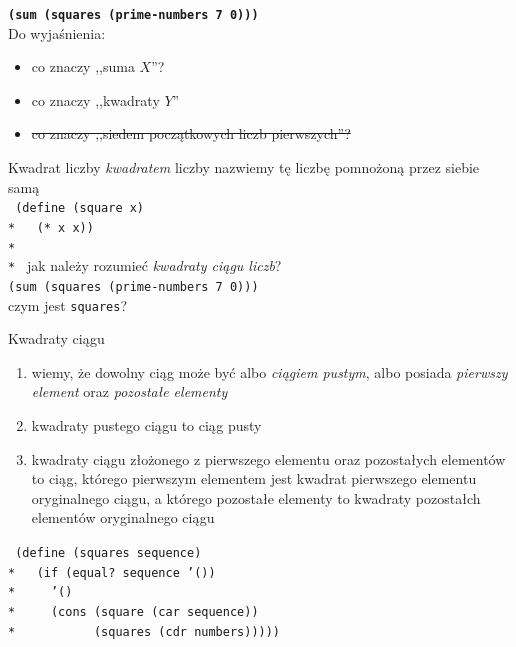 \documentclass{beamer}
\begin{document}


\begin{frame}
  \textbf{\texttt{(sum (squares (prime-numbers 7 0)))}}\\

  Do wyjaśnienia:
  \begin{itemize}
  \item co znaczy ,,suma $X$''?
  \item co znaczy ,,kwadraty $Y$''
  \item \sout{co znaczy ,,siedem początkowych liczb pierwszych''?}
  \end{itemize}
\end{frame}

\begin{frame}{Kwadrat liczby}
  \textit{kwadratem} liczby nazwiemy tę liczbę pomnożoną przez siebie samą\pause\\
  \texttt{
(define (square x)\\*
\ \ (* x x))\\*
\ \\*    
  }
  \pause
  jak należy rozumieć \textit{kwadraty ciągu liczb}?\\ \pause
  \texttt{(sum (squares (prime-numbers 7 0)))} \\ \pause
  {\tiny czym jest \texttt{squares}?}
\end{frame}

\begin{frame}{Kwadraty ciągu}
  \begin{enumerate}
  \item wiemy, że dowolny ciąg może być albo \textit{ciągiem pustym},
    albo posiada \textit{pierwszy element} oraz
    \textit{pozostałe elementy} \pause
    
  \item kwadraty pustego ciągu to ciąg pusty \pause
    
  \item kwadraty ciągu złożonego z pierwszego elementu oraz pozostałych
    elementów to ciąg, którego pierwszym elementem jest kwadrat pierwszego
    elementu oryginalnego ciągu, a którego pozostałe elementy to kwadraty
    pozostałch elementów oryginalnego ciągu \pause

  \end{enumerate}
  \texttt{
(define (squares sequence)\\*
\ \ (if (equal?\ sequence '())\\*
\ \ \ \ '()\\*
\ \ \ \ (cons (square (car sequence))\\*
\ \ \ \ \ \ \ \ \ \ (squares (cdr numbers)))))
  }
  
\end{frame}
\end{document}
